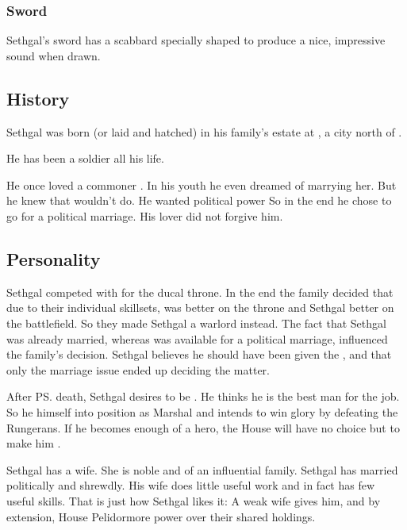 \subsubsection{Sword}
Sethgal's sword has a scabbard specially shaped to produce a nice, impressive  sound when drawn.









\subsection{History}
Sethgal was born (or laid and hatched) in his family's estate at , a city north of \Malcur. 

He has been a soldier all his life. 

He once loved a commoner \sphyle{}. 
In his youth he even dreamed of marrying her. 
But he knew that wouldn't do. 
He wanted political power
So in the end he chose to go for a political marriage. 
His lover did not forgive him. 









\subsection{Personality}
Sethgal competed with \Icor{} for the ducal throne. 
In the end the family decided that due to their individual skillsets, \Icor{} was better on the throne and Sethgal better on the battlefield. 
So they made Sethgal a warlord instead. 
The fact that Sethgal was already married, whereas \Icor{} was available for a political marriage, influenced the family's decision.
Sethgal believes he should have been given the \rayuthship, and that only the marriage issue ended up deciding the matter. 

After \ps{\Icor} death, Sethgal desires to be \rayuth. 
He thinks he is the best man for the job. 
So he \manoeuvres himself into position as Marshal and intends to win glory by defeating the Rungerans. 
If he becomes enough of a hero, the House will have no choice but to make him \rayuth. 

Sethgal has a wife. 
She is noble and of an influential family. 
Sethgal has married politically and shrewdly. 
His wife does little useful work and in fact has few useful skills. 
That is just how Sethgal likes it: 
A weak wife gives him\dash, and by extension, House Pelidor\dash more power over their shared holdings. 


